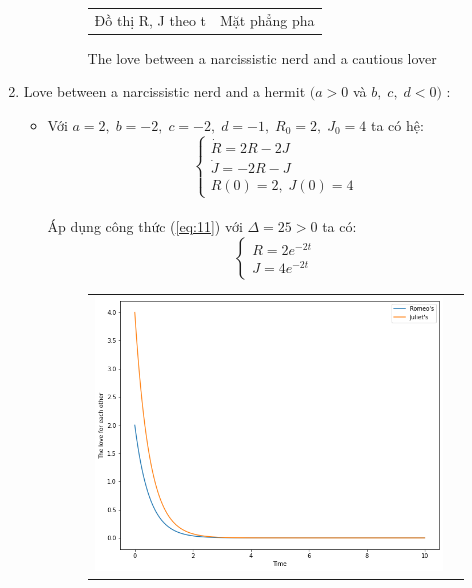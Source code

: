 \documentclass[a4paper]{article}
\begin{document}
\begin{enumerate}
\begin{itemize}
\begin{figure}[htp]
\begin{tabular}{cc}
            Đồ thị R, J theo t & Mặt phẳng pha
        \end{tabular}
        \caption{The love between a narcissistic nerd and a cautious lover}
    \end{figure}
    \end{itemize}
\item
Love between a narcissistic nerd and a hermit $(a > 0$ và $b,\;c,\;d < 0)$ :
    \begin{itemize}
    \item Với $a = 2,\;b = -2,\;c = -2,\;d = -1,\;R_0 = 2,\;J_0 = 4$ ta có hệ:
    $$\begin{cases} \dot{R}=2R-2J \\ \dot{J}=-2R-J \\ R(0)=2,\;J(0)=4 \end{cases}$$ \\
    Áp dụng công thức (\ref{eq:11}) với $\Delta = 25 > 0$ ta có:
    $$\begin{cases}
        R = 2e^{-2t} \\
        J = 4e^{-2t}
    \end{cases}$$
    \begin{figure}[htp]
        \centering
        \begin{tabular}{cc}
            \includegraphics[scale = .33]{Images/Bt2/7.1_gr.png} &

\end{tabular}
\end{figure}
\end{itemize}
\end{enumerate}
\end{document}
